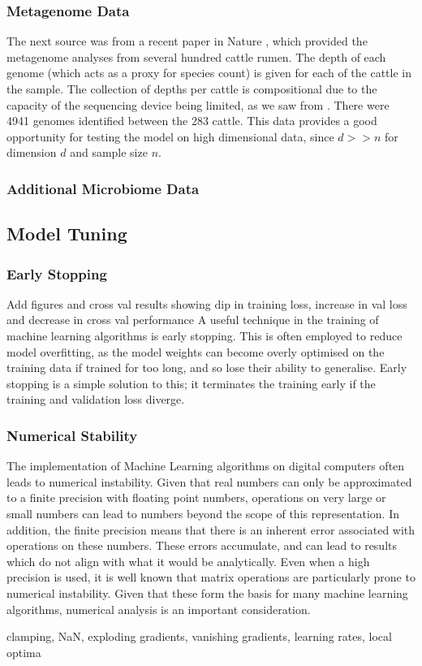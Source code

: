 \subsubsection{Metagenome Data}
The next source was from a recent paper in Nature \citep{Stewart2019}, which provided the metagenome analyses from several hundred cattle rumen. The depth of each genome (which acts as a proxy for species count) is given for each of the cattle in the sample. The collection of depths per cattle is compositional due to the capacity of the sequencing device being limited, as we saw from \cite{Gloor2017}. There were 4941 genomes identified between the 283 cattle. This data provides a good opportunity for testing the model on high dimensional data, since $d >> n$ for dimension $d$ and sample size $n$.  

\subsubsection{Additional Microbiome Data}


\subsection{Model Tuning}
\subsubsection{Early Stopping}
Add figures and cross val results showing dip in training loss, increase in val loss and decrease in cross val performance
A useful technique in the training of machine learning algorithms is early stopping. This is often employed to reduce model overfitting, as the model weights can become overly optimised on the training data if trained for too long, and so lose their ability to generalise. Early stopping is a simple solution to this; it terminates the training early if the training and validation loss diverge. 



\subsubsection{Numerical Stability}
The implementation of Machine Learning algorithms on digital computers often leads to numerical instability. Given that real numbers can only be approximated to a finite precision with floating point numbers, operations on very large or small numbers can lead to numbers beyond the scope of this representation. In addition, the finite precision means that there is an inherent error associated with operations on these numbers. These errors accumulate, and can lead to results which do not align with what it would be analytically. Even when a high precision is used, it is well known that matrix operations are particularly prone to numerical instability. Given that these form the basis for many machine learning algorithms, numerical analysis is an important consideration.

clamping, NaN, exploding gradients, vanishing gradients, learning rates, local optima 














